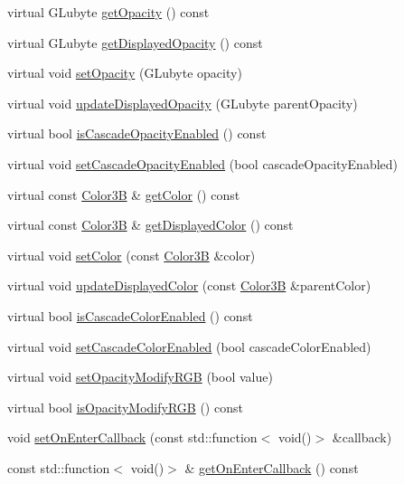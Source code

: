 \begin{DoxyCompactItemize}
\item 
virtual G\+Lubyte \hyperlink{classNode_ab999cce3763ea09e74014245c770ea97}{get\+Opacity} () const
\item 
virtual G\+Lubyte \hyperlink{classNode_ac4f9c61560c8862ebdaecbf79bf8a1b6}{get\+Displayed\+Opacity} () const
\item 
virtual void \hyperlink{classNode_ae41a9db63bfa3d466ee7c9d79c35352d}{set\+Opacity} (G\+Lubyte opacity)
\item 
virtual void \hyperlink{classNode_a3a0122884e7e1ce310b8b68abfbb245b}{update\+Displayed\+Opacity} (G\+Lubyte parent\+Opacity)
\item 
virtual bool \hyperlink{classNode_a79f5da3b20b08356467db7ce95cf9f54}{is\+Cascade\+Opacity\+Enabled} () const
\item 
virtual void \hyperlink{classNode_a56b08f1d19bb0345f6fb40d9a3e3b4a4}{set\+Cascade\+Opacity\+Enabled} (bool cascade\+Opacity\+Enabled)
\item 
virtual const \hyperlink{structColor3B}{Color3B} \& \hyperlink{classNode_a06721d272f5a59e02e355d95be25bb99}{get\+Color} () const
\item 
virtual const \hyperlink{structColor3B}{Color3B} \& \hyperlink{classNode_a899760bbad414bfbe9fb51473e99c3eb}{get\+Displayed\+Color} () const
\item 
virtual void \hyperlink{classNode_af45037de5b13602263b1ce51b50cafdd}{set\+Color} (const \hyperlink{structColor3B}{Color3B} \&color)
\item 
virtual void \hyperlink{classNode_ac733bae7b9590f8da746cbc3d1337a2f}{update\+Displayed\+Color} (const \hyperlink{structColor3B}{Color3B} \&parent\+Color)
\item 
virtual bool \hyperlink{classNode_abf874f1b388e773ca80732b1134508be}{is\+Cascade\+Color\+Enabled} () const
\item 
virtual void \hyperlink{classNode_a4e7f2dde1e3a7d56880f59f1480955e7}{set\+Cascade\+Color\+Enabled} (bool cascade\+Color\+Enabled)
\item 
virtual void \hyperlink{classNode_a978c5435ab23f76e9efdf0f7e9e288e5}{set\+Opacity\+Modify\+R\+GB} (bool value)
\item 
virtual bool \hyperlink{classNode_ae6ce32d2088e2bb3426608334f1091c5}{is\+Opacity\+Modify\+R\+GB} () const
\item 
void \hyperlink{classNode_a69c42f72323ef791d720b9083f480cb4}{set\+On\+Enter\+Callback} (const std\+::function$<$ void()$>$ \&callback)
\item 
const std\+::function$<$ void()$>$ \& \hyperlink{classNode_ad7b097bc5f33406aa84f0b31cabc8c91}{get\+On\+Enter\+Callback} () const

\end{DoxyCompactItemize}
